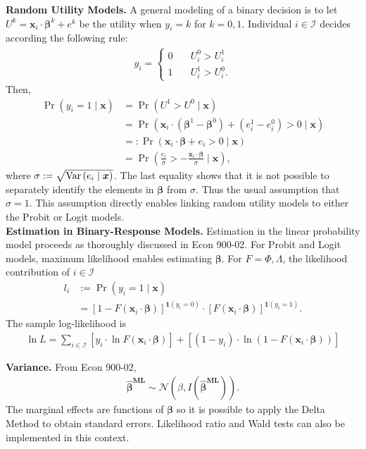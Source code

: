 \noindent \textbf{Random Utility Models.} A general modeling of a binary decision is to let $U^k = \bm{x}_i \cdot \bm{\beta}^k + e^k$ be the utility when $y_i = k$ for $k = 0, 1$. Individual $i \in \mathcal{I}$ decides according the following rule: 
\begin{align}
y_i = \left\{
        \begin{array}{ll}
            0 & \quad U_i^0 > U_i^1 \\
            1 & \quad U_i^1 > U_i^0.
        \end{array}
    \right. \nonumber
\end{align}
\noindent Then, 
\begin{align}
	 \Pr \left( y_i = 1 \mid \bm{x} \right) &= \Pr \left( U^1 > U^0 \mid \bm{x} \right) \nonumber \\ 
	 & = \Pr \left( \bm{x}_i \cdot \left( \bm{\beta}^1 - \bm{\beta}^0 \right) + \left( e_i^1 - e_i^0 \right) > 0 \mid \bm{x} \right) \nonumber \\
	 & =: \Pr \left( \bm{x}_i \cdot \bm{\beta} + e_i > 0 \mid \bm{x} \right) \\ \nonumber
	 & =  \Pr \left( \frac{e_i}{\sigma} > - \frac{\bm{x}_i \cdot \bm{\beta}}{\sigma} \mid \bm{x} \right), 
\end{align}
\noindent where $\sigma:= \sqrt{\operatorname{Var} \left( e_i \mid \bm{x} \right)}$. The last equality shows that it is not possible to separately identify the elements in $\bm{\beta}$ from $\sigma$. Thus the usual assumption that $\sigma = 1$. This assumption directly enables linking random utility models to either the Probit or Logit models.\\

\noindent \textbf{Estimation in Binary-Response Models.} Estimation in the linear probability model proceeds as thoroughly discussed in Econ 900-02. For Probit and Logit models, maximum likelihood enables estimating $\bm{\beta}$. For $F = \Phi, \Lambda$, the likelihood contribution of $i \in \mathcal{I}$
 \begin{align}
 	l_i & :=  \Pr \left( y_i = 1 \mid \bm{x} \right) \nonumber \\ 
 	& = {\left[ 1 - F \left( \bm{x}_i \cdot \bm{\beta} \right) \right]}^{\bm{1} \left( y_i = 0 \right)} \cdot {\left[F \left( \bm{x}_i \cdot \bm{\beta} \right) \right]}^{\bm{1} \left( y_i = 1 \right)}. 
 \end{align}
 \noindent The sample log-likelihood is 
 \begin{align}
 \ln L = \sum \limits _{i \in \mathcal{I}} \left[ y_i \cdot \ln F \left( \bm{x}_i \cdot \bm{\beta} \right) \right]  + \left[ \left( 1 - y_i \right) \cdot \ln \left( 1 - F \left( \bm{x}_i \cdot \bm{\beta} \right) \right) \right] 
 \end{align}

\noindent \textbf{Variance.} From Econ 900-02, 
\begin{align}
	\bm{\hat{\beta}^{\text{ML}}} \sim \mathcal{N} \left( \beta, I \left( \bm{\hat{\beta}^{\text{ML}}}  \right) \right). 
\end{align}
\noindent The marginal effects are functions of $\bm{\beta}$ so it is possible to apply the Delta Method to obtain standard errors. Likelihood ratio and Wald tests can also be implemented in this context. 


